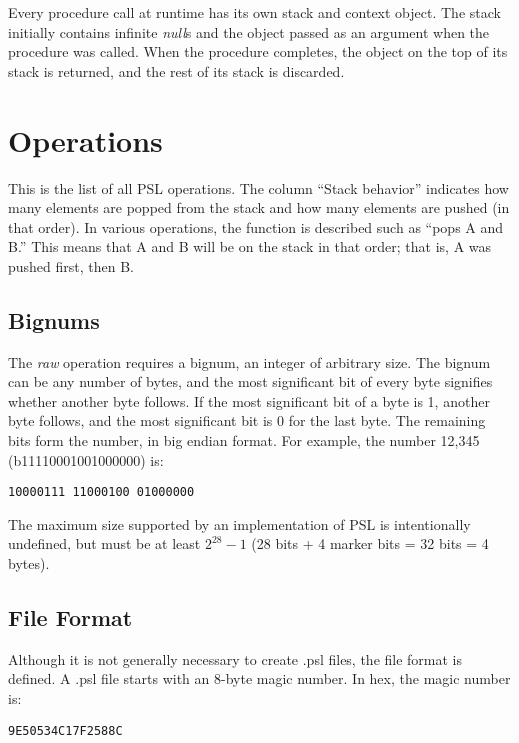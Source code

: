 Every procedure call at runtime has its own stack and context object. The stack initially contains infinite \textit{null}s and the object passed as an argument when the procedure was called. When the procedure completes, the object on the top of its stack is returned, and the rest of its stack is discarded.



\section{Operations}

This is the list of all PSL operations. The column ``Stack behavior'' indicates how many elements are popped from the stack and how many elements are pushed (in that order). In various operations, the function is described such as ``pops A and B.'' This means that A and B will be on the stack in that order; that is, A was pushed first, then B.



\noindent
{}

\subsection{Bignums}

The \textit{raw} operation requires a bignum, an integer of arbitrary size. The bignum can be any number of bytes, and the most significant bit of every byte signifies whether another byte follows. If the most significant bit of a byte is 1, another byte follows, and the most significant bit is 0 for the last byte. The remaining bits form the number, in big endian format. For example, the number 12,345 (b11110001001000000) is:

\noindent\texttt{10000111 11000100 01000000}

The maximum size supported by an implementation of PSL is intentionally undefined, but must be at least $2^{28}-1$ (28 bits + 4 marker bits = 32 bits = 4 bytes).



\subsection{File Format}

Although it is not generally necessary to create .psl files, the file format is defined. A .psl file starts with an 8-byte magic number. In hex, the magic number is:

\noindent\texttt{9E50534C17F2588C}

